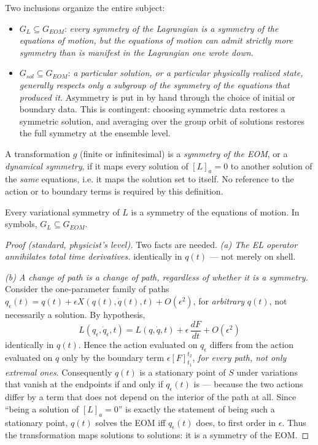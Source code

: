 Two inclusions organize the entire subject:
\begin{itemize}
    \item $G_L \subseteq G_{EOM}$: \emph{every symmetry of the Lagrangian is a
        symmetry of the equations of motion, but the equations of motion can
        admit strictly more symmetry than is manifest in the Lagrangian one
        wrote down.} 
    \item $G_{sol} \subseteq G_{EOM}$: \emph{a particular solution, or a
        particular physically realized state, generally respects only a
        subgroup of the symmetry of the equations that produced it.} 
        Asymmetry is put in by hand
        through the choice of initial or boundary data. This is contingent:
        choosing symmetric data restores a symmetric solution, and averaging
        over the group orbit of solutions restores the full symmetry at the
        ensemble level.
   \end{itemize}

\begin{definition}
A transformation $g$ (finite or infinitesimal) is a \emph{symmetry of the EOM},
    or a \emph{dynamical symmetry}, if it maps every solution of $[L]_a=0$ to 
    another solution of the \emph{same} equations, i.e. it maps the solution 
    set to itself. No reference to the action or to boundary terms is required 
    by this definition.
\end{definition}

\begin{proposition}
\label{noether-forward}
Every variational symmetry of $L$ is a symmetry of the equations of motion. In
    symbols, $G_L \subseteq G_{EOM}$.
\end{proposition}

\begin{proof}[Proof (standard, physicist's level)]
Two facts are needed.
\emph{(a) The EL operator annihilates total time derivatives.} 
    identically  in $q(t)$ — not merely on shell.

\emph{(b) A change of path is a change of path, regardless of whether it is
    a symmetry.} Consider the one-parameter family of paths 
    $q_\epsilon(t) = q(t) + \epsilon X(q(t),\dot q(t),t) + O( \epsilon^2)$, 
    for \emph{arbitrary} $q(t)$, not necessarily a solution. By hypothesis,
\[
L(q_\epsilon,\dot q_\epsilon,t) = L(q,\dot q,t) + \epsilon\, \frac{dF}{dt} + O(\epsilon^2)
\]
identically in $q(t)$. Hence the action evaluated on $q_\epsilon$ differs from
    the action evaluated on $q$ only by the boundary term
    $\epsilon[F]_{t_1}^{t_2}$, \emph{for every path, not only extremal ones}.
    Consequently $q(t)$ is a stationary point of $S$ under variations that
    vanish at the endpoints if and only if $q_\epsilon(t)$ is — because the two
    actions differ by a term that does not depend on the interior of the path
    at all. Since ``being a solution of $[L]_a=0$'' is exactly the statement of
    being such a stationary point, $q(t)$ solves the EOM iff $q_\epsilon(t)$
    does, to first order in $\epsilon$. Thus the transformation maps solutions
    to solutions: it is a symmetry of the EOM.
\end{proof}

